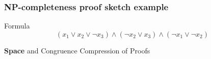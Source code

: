 \documentclass{beamer}
\begin{document}
\begin{frame}

\frametitle{NP-completeness proof sketch example}

\begin{block}{Formula}
$$(x_1 \vee x_2 \vee \neg x_3) \wedge (\neg x_2 \vee x_3) \wedge (\neg x_1 \vee \neg x_2)$$
\end{block}

\end{frame}

%
%

\begin{frame}

\centering \textbf{\huge{Space}} and Congruence Compression of Proofs

\end{frame}

%
%
%
%
%
\end{document}

